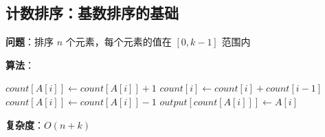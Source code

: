 \documentclass[12pt, a4paper]{ctexart}
\begin{document}
\subsection{计数排序：基数排序的基础}

\begin{blackboard}

\textbf{问题}：排序 $n$ 个元素，每个元素的值在 $[0, k-1]$ 范围内

\textbf{算法}：
\begin{algorithmic}[1]
\STATE {}
    \STATE $count[A[i]] \gets count[A[i]] + 1$
\ENDFOR
\STATE
\STATE {}
    \STATE $count[i] \gets count[i] + count[i-1]$
\ENDFOR
\STATE
\STATE {}
    \STATE $count[A[i]] \gets count[A[i]] - 1$
    \STATE $output[count[A[i]]] \gets A[i]$
\ENDFOR
\end{algorithmic}

\textbf{复杂度}：$O(n + k)$

\end{blackboard}
\end{document}
